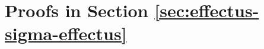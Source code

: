 \documentclass[%
	submission,
copyright,creativecommons,UKenglish]{eptcs}
\begin{document}







\appendix




\section{Proofs in Section \ref{sec:effectus-sigma-effectus}}
\label{appendix:proofs-sigma-effectus}
\end{document}
